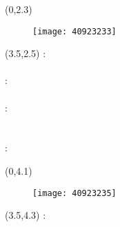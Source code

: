 \documentclass[14pt,a4paper]{report}  %
\begin{document}
\begin{flushleft}
	{\begin{textblock}{6}(0,2.3)
	\begin{figure}
	\texttt{[image: 40923233]} 
    \end{figure}
    \end{textblock}}
    {\renewcommand\baselinestretch{0.99}
    \selectfont %
    {\begin{textblock}{15}(3.5,2.5) %
\noindent\fontsize{14pt}{0em}\selectfont {}\enspace:\enspace
\fontsize{14pt}{0em}\selectfont {}\\ 
\hspace*{\fill} \\
\fontsize{14pt}{0em}\selectfont {}\enspace:\enspace
\noindent\fontsize{14pt}{0em}\selectfont {} \\ 
\hspace*{\fill} \\
\fontsize{14pt}{0em}\selectfont {}\enspace:\enspace
\fontsize{14pt}{0em}\selectfont {}\\
\fontsize{14pt}{0em}\selectfont \makebox[5em][s]{\quad}\enspace\enspace
\fontsize{14pt}{0em}\selectfont {}\\
\hspace*{\fill} \\
\fontsize{14pt}{0em}\selectfont {}\enspace:\enspace
    \end{textblock}}}
    \vspace{2em}
    {\begin{textblock}{6}(0,4.1)
    \begin{figure}
        \texttt{[image: 40923235]} %
    \end{figure}
    \end{textblock}}
    {\renewcommand\baselinestretch{0.99}\selectfont %
    {\begin{textblock}{15}(3.5,4.3) %
\noindent\fontsize{14pt}{0em}\selectfont {}\enspace:\enspace%
\fontsize{14pt}{0em}\selectfont {}\\ 
\hspace*{\fill} \\

\end{textblock}}}
\end{flushleft}
\end{document}
